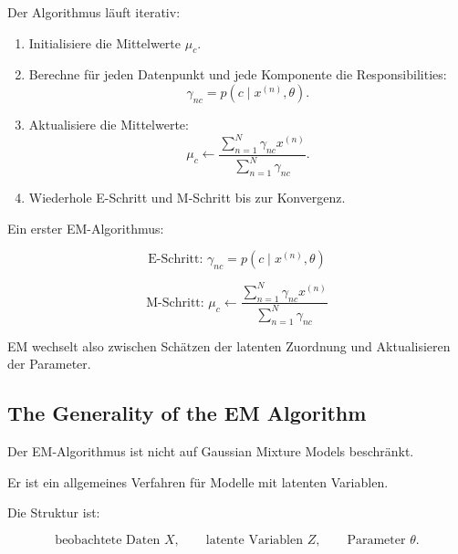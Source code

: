 \documentclass[11pt,a4paper]{scrartcl}
\begin{document}
\begin{solutionbox}
    Der Algorithmus läuft iterativ:

    \begin{enumerate}
        \item Initialisiere die Mittelwerte \(\mu_c\).
        \item Berechne für jeden Datenpunkt und jede Komponente die
        Responsibilities:
        \[
            \gamma_{nc}
            =
            p(c\mid x^{(n)},\theta).
        \]

        \item Aktualisiere die Mittelwerte:
        \[
            \mu_c
            \leftarrow
            \frac{
                \sum_{n=1}^{N}
                \gamma_{nc}x^{(n)}
            }{
                \sum_{n=1}^{N}
                \gamma_{nc}
            }.
        \]

        \item Wiederhole E-Schritt und M-Schritt bis zur Konvergenz.
    \end{enumerate}
\end{solutionbox}

\begin{answerbox}
    Ein erster EM-Algorithmus:

    \[
        \boxed{
            \text{E-Schritt: }
            \gamma_{nc}
            =
            p(c\mid x^{(n)},\theta)
        }
    \]

    \[
        \boxed{
            \text{M-Schritt: }
            \mu_c
            \leftarrow
            \frac{
                \sum_{n=1}^{N}
                \gamma_{nc}x^{(n)}
            }{
                \sum_{n=1}^{N}
                \gamma_{nc}
            }
        }
    \]

    EM wechselt also zwischen Schätzen der latenten Zuordnung und Aktualisieren
    der Parameter.
\end{answerbox}

\subsection{The Generality of the EM Algorithm}

\begin{notebox}
    Der EM-Algorithmus ist nicht auf Gaussian Mixture Models beschränkt.

    Er ist ein allgemeines Verfahren für Modelle mit latenten Variablen.

    Die Struktur ist:

    \[
        \text{beobachtete Daten } X,
        \qquad
        \text{latente Variablen } Z,
        \qquad
        \text{Parameter } \theta.
    \]
\end{notebox}
\end{document}

